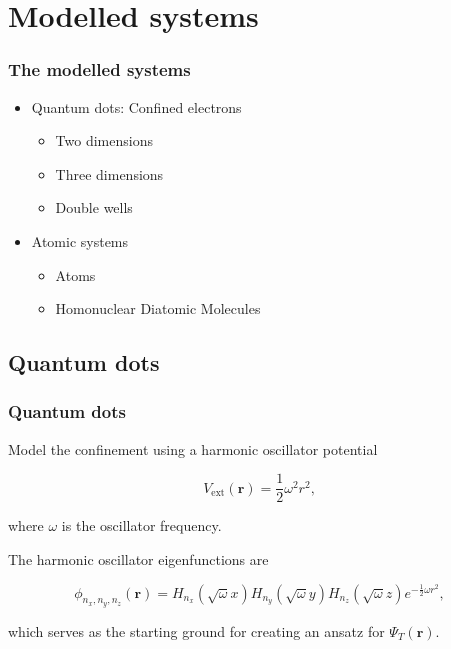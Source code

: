 \section{Modelled systems}

\begin{frame}
 \frametitle{The modelled systems}
 \begin{itemize}
  \item Quantum dots: Confined electrons
  \begin{itemize}
  \item Two dimensions
  \item Three dimensions
  \item Double wells
  \end{itemize}
  \pause
  \item Atomic systems
  \begin{itemize}
  \item Atoms
  \item Homonuclear Diatomic Molecules
  \end{itemize}
 \end{itemize}
\end{frame}

\subsection{Quantum dots}

\begin{frame}
 \frametitle{Quantum dots}
 
 Model the confinement using a harmonic oscillator potential
 
 \begin{equation*}
  V_\mathrm{ext}(\mathbf{r}) = \frac{1}{2}\omega^2r^2,
 \end{equation*}
 
 where $\omega$ is the oscillator frequency.
 
 \pause
 
 The harmonic oscillator eigenfunctions are
 
 \begin{equation*}
  \phi_{n_x, n_y, n_z}(\mathbf{r}) = H_{n_x}(\sqrt{\omega}x)H_{n_y}(\sqrt{\omega}y)H_{n_z}(\sqrt{\omega}z)e^{-\frac{1}{2}\omega r^2},
 \end{equation*}
 
 which serves as the starting ground for creating an ansatz for $\Psi_T(\mathbf{r})$.


 
\end{frame}

